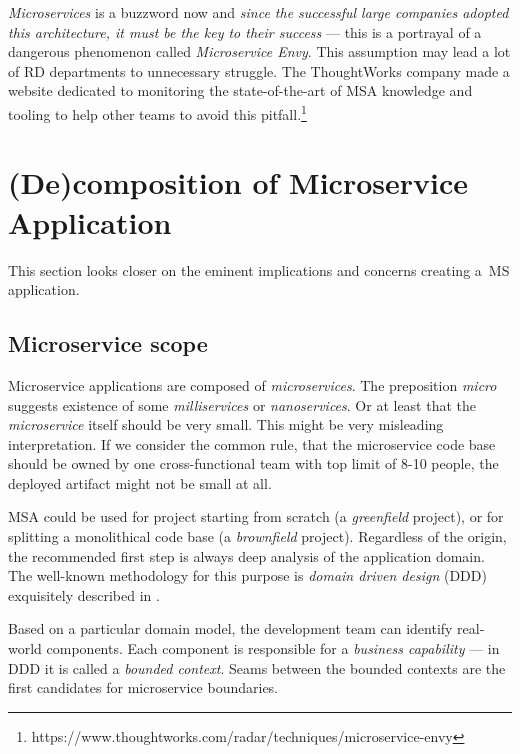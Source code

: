 \documentclass[thesis=M,english,hidelinks]{FITthesis}[2012/10/20]
\begin{document}
\textit{Microservices} is a buzzword now and \textit{since the successful large companies adopted this architecture, it must be the key to their success} --- this is a portrayal of a dangerous phenomenon called \textit{Microservice Envy}. This assumption may lead a lot of \acrshort{RD} departments to unnecessary struggle. The ThoughtWorks company made a website dedicated to monitoring the state-of-the-art of \acrshort{MSA} knowledge and tooling to help other teams to avoid this pitfall.\footnote{https://www.thoughtworks.com/radar/techniques/microservice-envy}


\section{(De)composition of Microservice Application}

This section looks closer on the eminent implications and concerns creating a~\acrlong{MS} application.

\subsection{Microservice scope}
Microservice applications are composed of \textit{microservices}. The preposition \textit{micro} suggests existence of some \textit{milliservices} or \textit{nanoservices}. Or at least that the \textit{microservice} itself should be very small. This might be very misleading interpretation. If we consider the common rule, that the microservice code base should be owned by one cross-functional team \cite{ms-building-ms, ms-evolutionary-arch, ms-fow-new-term-def} with top limit of 8-10 people, the deployed artifact might not be small at all.

\acrshort{MSA} could be used for project starting from scratch (a \textit{greenfield} project), or for splitting a monolithical code base (a \textit{brownfield} project). Regardless of the origin, the recommended first step is always deep analysis of the application domain. The well-known methodology for this purpose is \textit{domain driven design} (\acrshort{DDD}) exquisitely described in \cite{domain-driven-design}.

Based on a particular domain model, the development team can identify real-world components. Each component is responsible for a \textit{business capability} --- in \acrshort{DDD} it is called a \textit{bounded context}. Seams between the bounded contexts are the first candidates for microservice boundaries.
\end{document}

